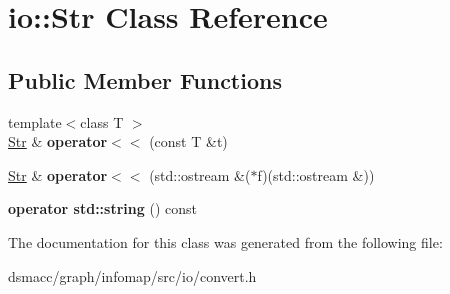 \hypertarget{classio_1_1Str}{}\section{io\+:\+:Str Class Reference}
\label{classio_1_1Str}
\subsection*{Public Member Functions}
\begin{DoxyCompactItemize}
\item 
\mbox{\label{classio_1_1Str_a917683384e1a15d20eaf70c09c88b7f3}} 
{\footnotesize template$<$class T $>$ }\\\mbox{\hyperlink{classio_1_1Str}{Str}} \& {\bfseries operator$<$$<$} (const T \&t)
\item 
\mbox{\label{classio_1_1Str_a252d8d80d1dc008127c08b9ed66c7af3}} 
\mbox{\hyperlink{classio_1_1Str}{Str}} \& {\bfseries operator$<$$<$} (std\+::ostream \&($\ast$f)(std\+::ostream \&))
\item 
\mbox{\label{classio_1_1Str_a75ad4161b409cfa3c4caf9bb9b9e9283}} 
{\bfseries operator std\+::string} () const
\end{DoxyCompactItemize}


The documentation for this class was generated from the following file\+:\begin{DoxyCompactItemize}
\item 
dsmacc/graph/infomap/src/io/convert.\+h\end{DoxyCompactItemize}
